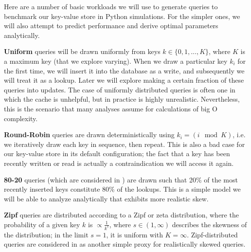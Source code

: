 \documentclass{sig-alternate-05-2015}
\begin{document}
Here are a number of basic workloads we will use to generate queries to
benchmark our key-value store in Python simulations. For
the simpler ones, we will also attempt to predict performance and derive
optimal parameters analytically.

\textbf{Uniform} queries will be drawn uniformly from keys $k \in
\{0,1,...,K\}$, where $K$ is a maximum key (that we explore varying). When we
draw a particular key $k_i$ for the first time, we will insert it into the
database as a write, and subsequently we will treat it as a lookup. Later we
will explore making a certain fraction of these queries into updates. The case
of uniformly distributed queries is often one in which the cache is unhelpful,
but in practice is highly unrealistic. Nevertheless, this is the scenario that
many analyses assume for calculations of big O complexity.

\textbf{Round-Robin} queries are drawn deterministically using $k_i = (i \mod
K)$, i.e. we iteratively draw each key in sequence, then repeat. This is also a
bad case for our key-value store in its default configuration; the fact that a
key has been recently written or read is actually a contraindication we will
access it again.

\textbf{80-20} queries (which are considered in \cite{monkey}) are drawn such
that 20\% of the most recently inserted keys constitute 80\% of the lookups.
This is a simple model we will be able to analyze analytically that exhibits
more realistic skew.

\textbf{Zipf} queries are distributed according to a Zipf or zeta distribution,
where the probability of a given key $k$ is $\propto \frac{1}{k^s}$, where $s
\in (1, \infty)$ describes the skewness of the distribution; in the limit
$s=1$, it is uniform with $K=\infty$. Zipf-distributed queries are considered
in \cite{art} as another simple proxy for realistically skewed queries.
\end{document}
